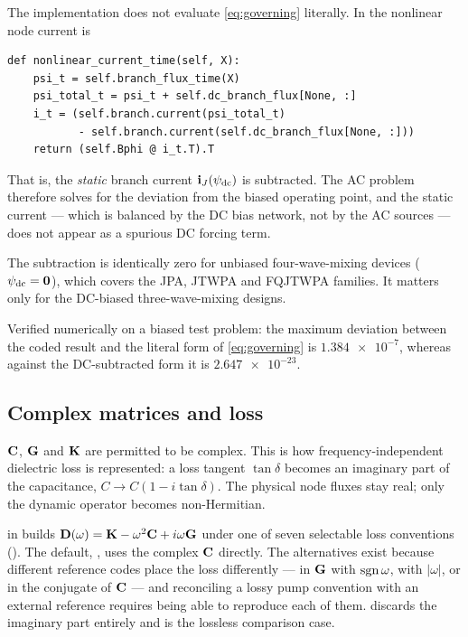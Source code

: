 \begin{implnote}
\label{impl:dc-subtraction}
The implementation does not evaluate \eqref{eq:governing} literally. In
 the nonlinear node current is
\begin{lstlisting}
def nonlinear_current_time(self, X):
    psi_t = self.branch_flux_time(X)
    psi_total_t = psi_t + self.dc_branch_flux[None, :]
    i_t = (self.branch.current(psi_total_t)
           - self.branch.current(self.dc_branch_flux[None, :]))
    return (self.Bphi @ i_t.T).T
\end{lstlisting}
That is, the \emph{static} branch current $\mathbf{i}_{J}(\psi_{\mathrm{dc}})$ is
subtracted. The AC problem therefore solves for the deviation from the biased
operating point, and the static current --- which is balanced by the DC bias
network, not by the AC sources --- does not appear as a spurious DC forcing
term.

The subtraction is identically zero for unbiased four-wave-mixing devices
($\psi_{\mathrm{dc}}=\mathbf{0}$), which covers the JPA, JTWPA and FQJTWPA
families. It matters only for the DC-biased three-wave-mixing designs.

Verified numerically on a biased test problem: the maximum deviation between
the coded result and the literal form of \eqref{eq:governing} is
$\num{1.384e-7}$, whereas against the DC-subtracted form it is
$\num{2.647e-23}$.
\end{implnote}

\subsection{Complex matrices and loss}

$\mathbf{C}$, $\mathbf{G}$ and $\mathbf{K}$ are permitted to be complex. This is how
frequency-independent dielectric loss is represented: a loss tangent
$\tan\delta$ becomes an imaginary part of the capacitance,
$C \to C(1 - i\tan\delta)$. The physical node fluxes stay real; only the
dynamic operator becomes non-Hermitian.

\begin{implnote}
 in  builds
$\mathbf{D}(\omega) = \mathbf{K} - \omega^{2}\mathbf{C} + i\omega\mathbf{G}$ under one of seven
selectable loss conventions (). The default,
, uses the complex $\mathbf{C}$ directly. The alternatives
exist because different reference codes place the loss differently ---
in $\mathbf{G}$ with $\operatorname{sgn}\omega$, with $|\omega|$, or in the conjugate of $\mathbf{C}$
--- and reconciling a lossy pump convention with an external reference requires
being able to reproduce each of them.  discards the
imaginary part entirely and is the lossless comparison case.
\end{implnote}

